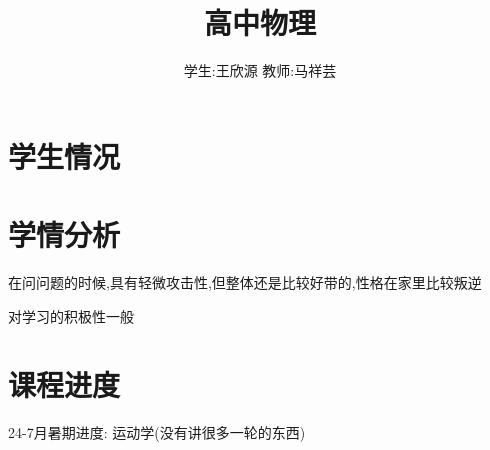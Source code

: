 \documentclass{article}
\title{高中物理}
\author{学生:\quad 王欣源 \quad 教师:\quad 马祥芸}
\begin{document}
\maketitle
\tableofcontents
\newpage
{}

\section{学生情况}
\begin{center}
\end{center}

\section{学情分析}
在问问题的时候,具有轻微攻击性,但整体还是比较好带的,性格在家里比较叛逆

对学习的积极性一般

\vspace{2em}

\section{课程进度}
24-7月暑期进度: 运动学(没有讲很多一轮的东西)
\end{document}
